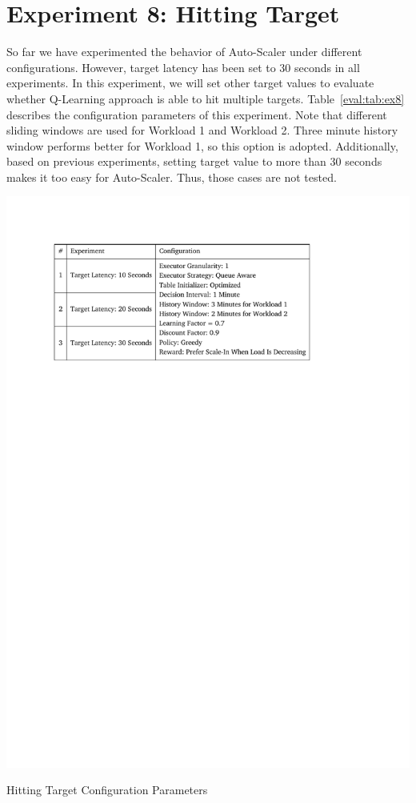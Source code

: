 \section{Experiment 8: Hitting Target}
So far we have experimented the behavior of Auto-Scaler under different configurations. However, target latency has been set to 30 seconds in all experiments. In this experiment, we will set other target values to evaluate whether Q-Learning approach is able to hit multiple targets. Table~\ref{eval:tab:ex8} describes the configuration parameters of this experiment. Note that different sliding windows are used for Workload 1 and Workload 2. Three minute history window performs better for Workload 1, so this option is adopted. Additionally, based on previous experiments, setting target value to more than 30 seconds makes it too easy for Auto-Scaler. Thus, those cases are not tested. 
\begin{table}[h]
    \includegraphics[clip,trim=2.4cm 21.18cm 5.1cm 2.5cm]{tables/ex8.pdf}
    \centering
    \caption{Hitting Target Configuration Parameters}
    \label{eval:tab:ex8}
\end{table}

